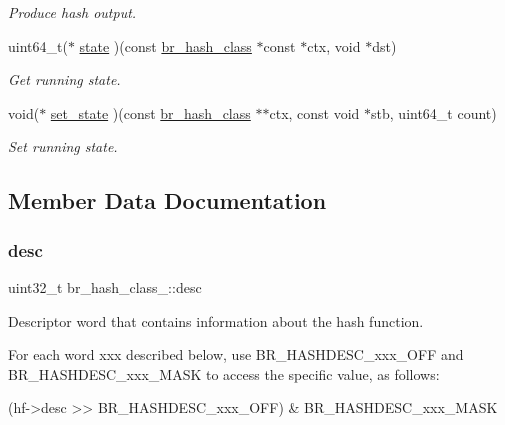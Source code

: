 \begin{DoxyCompactItemize}
\begin{DoxyCompactList}\small\item\em Produce hash output. \end{DoxyCompactList}\item 
uint64\+\_\+t($\ast$ \hyperlink{structbr__hash__class___ad5feeec7686f6d9ea9c378353c308d10}{state} )(const \hyperlink{bearssl__hash_8h_ae38c1b9d539537cc16fc84388b922d86}{br\+\_\+hash\+\_\+class} $\ast$const $\ast$ctx, void $\ast$dst)
\begin{DoxyCompactList}\small\item\em Get running state. \end{DoxyCompactList}\item 
void($\ast$ \hyperlink{structbr__hash__class___a1b8f07b0f48736ed41b5a7900f9bf335}{set\+\_\+state} )(const \hyperlink{bearssl__hash_8h_ae38c1b9d539537cc16fc84388b922d86}{br\+\_\+hash\+\_\+class} $\ast$$\ast$ctx, const void $\ast$stb, uint64\+\_\+t count)
\begin{DoxyCompactList}\small\item\em Set running state. \end{DoxyCompactList}\end{DoxyCompactItemize}


\subsection{Member Data Documentation}
\mbox{\label{structbr__hash__class___a83ce0b40ed9d8de4cdfde6391c7d8728}} 
\subsubsection{\texorpdfstring{desc}{desc}}
{\footnotesize\ttfamily uint32\+\_\+t br\+\_\+hash\+\_\+class\+\_\+\+::desc}



Descriptor word that contains information about the hash function. 

For each word {\ttfamily xxx} described below, use {\ttfamily B\+R\+\_\+\+H\+A\+S\+H\+D\+E\+S\+C\+\_\+xxx\+\_\+\+O\+FF} and {\ttfamily B\+R\+\_\+\+H\+A\+S\+H\+D\+E\+S\+C\+\_\+xxx\+\_\+\+M\+A\+SK} to access the specific value, as follows\+: \begin{DoxyVerb}(hf->desc >> BR_HASHDESC_xxx_OFF) & BR_HASHDESC_xxx_MASK
\end{DoxyVerb}


